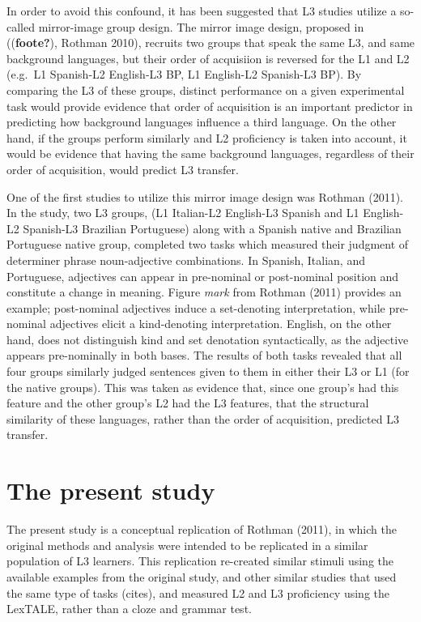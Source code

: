 \documentclass[
  man]{apa6}
\begin{document}
In order to avoid this confound, it has been suggested that L3 studies utilize a so-called mirror-image group design.
The mirror image design, proposed in ((\textbf{foote?}), Rothman 2010), recruits two groups that speak the same L3, and same background languages, but their order of acquisiion is reversed for the L1 and L2 (e.g.~L1 Spanish-L2 English-L3 BP, L1 English-L2 Spanish-L3 BP).
By comparing the L3 of these groups, distinct performance on a given experimental task would provide evidence that order of acquisition is an important predictor in predicting how background languages influence a third language.
On the other hand, if the groups perform similarly and L2 proficiency is taken into account, it would be evidence that having the same background languages, regardless of their order of acquisition, would predict L3 transfer.

One of the first studies to utilize this mirror image design was Rothman (2011).
In the study, two L3 groups, (L1 Italian-L2 English-L3 Spanish and L1 English-L2 Spanish-L3 Brazilian Portuguese) along with a Spanish native and Brazilian Portuguese native group, completed two tasks which measured their judgment of determiner phrase noun-adjective combinations.
In Spanish, Italian, and Portuguese, adjectives can appear in pre-nominal or post-nominal position and constitute a change in meaning.
Figure \emph{mark} from Rothman (2011) provides an example; post-nominal adjectives induce a set-denoting interpretation, while pre-nominal adjectives elicit a kind-denoting interpretation.
English, on the other hand, does not distinguish kind and set denotation syntactically, as the adjective appears pre-nominally in both bases.
The results of both tasks revealed that all four groups similarly judged sentences given to them in either their L3 or L1 (for the native groups).
This was taken as evidence that, since one group's had this feature and the other group's L2 had the L3 features, that the structural similarity of these languages, rather than the order of acquisition, predicted L3 transfer.

\hypertarget{the-present-study}{%
\section{The present study}\label{the-present-study}}

The present study is a conceptual replication of Rothman (2011), in which the original methods and analysis were intended to be replicated in a similar population of L3 learners.
This replication re-created similar stimuli using the available examples from the original study, and other similar studies that used the same type of tasks (cites), and measured L2 and L3 proficiency using the LexTALE, rather than a cloze and grammar test.
\end{document}
